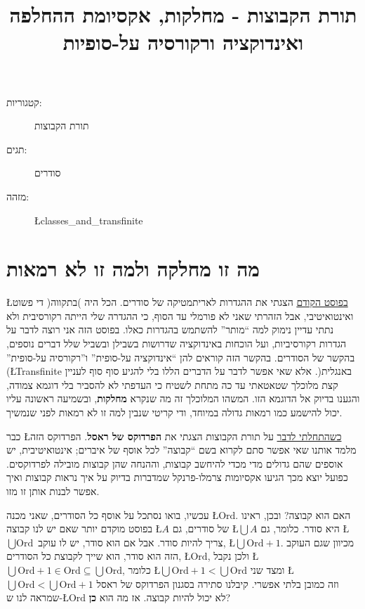 \documentclass[english,hebrew]{article}
\begin{document}
\title{תורת הקבוצות - מחלקות, אקסיומת ההחלפה ואינדוקציה ורקורסיה על-סופיות}
\maketitle
\begin{description}
\item [{קטגוריות:}] תורת הקבוצות
\item [{תגים:}] סודרים
\item [{מזהה:}] \L{classes\_and\_transfinite}
\end{description}

\section*{מה זו מחלקה ולמה זו לא רמאות}

\L{\href{https://gadial.net/2023/01/14/ordinal_arithmetic/}{בפוסט הקודם}}
הצגתי את ההגדרות לאריתמטיקה של סודרים. הכל היה )בתקווה( די פשוט ואינטואיטיבי,
אבל הזהרתי שאני לא פורמלי עד הסוף, כי ההגדרה שלי הייתה רקורסיבית ולא
נתתי עדיין נימוק למה \textquotedblleft מותר\textquotedblright{} להשתמש
בהגדרות כאלו. בפוסט הזה אני רוצה לדבר על הגדרות רקורסיביות, ועל הוכחות
באינדוקציה שדרושות בשבילן ובשביל שלל דברים נוספים, בהקשר של הסודרים.
בהקשר הזה קוראים להן \textquotedblleft אינדוקציה על-סופית\textquotedblright{}
ו\textquotedblright רקורסיה על-סופית\textquotedblright{} )\L{Transfinite}
באנגלית(. אלא שאי אפשר לדבר על הדברים הללו בלי להגיע סוף סוף לעניין
קצת מלוכלך שטאטאתי עד כה מתחת לשטיח כי העדפתי לא להסביר בלי דוגמא
צמודה, והגענו בדיוק אל הדוגמא הזו. המשהו המלוכלך זה מה שנקרא \textbf{מחלקות},
ובשמיעה ראשונה עליו יכול להישמע כמו רמאות גדולה במיוחד, ודי קריטי
שנבין למה זו לא רמאות לפני שנמשיך.

כבר \L{\href{https://gadial.net/2019/10/19/what_is_set_theory/}{כשהתחלתי לדבר}}
על תורת הקבוצות הצגתי את \textbf{הפרדוקס של ראסל}. הפרדוקס הזה מלמד
אותנו שאי אפשר סתם לקרוא בשם \textquotedblleft קבוצה\textquotedblright{}
לכל אוסף של איברים; אינטואיטיבית, יש אוספים שהם גדולים מדי מכדי להיחשב
קבוצות, וההנחה שהן קבוצות מובילה לפרדוקסים. כפועל יוצא מכך הגיעו אקסיומות
צרמלו-פרנקל שמדברות בדיוק על איך נראות קבוצות ואיך אפשר לבנות אותן
זו מזו.

עכשיו, בואו נסתכל על אוסף כל הסודרים, שאני מכנה \L{$\text{Ord}$}.
האם הוא קבוצה? ובכן, ראינו בפוסט מוקדם יותר שאם יש לנו קבוצה \L{$A$}
של סודרים, גם \L{$\bigcup A$} היא סודר. כלומר, גם \L{$\bigcup\text{Ord}$}
צריך להיות סודר. אבל אם הוא סודר, יש לו עוקב, \L{$\bigcup\text{Ord}+1$}.
מכיוון שגם העוקב הזה הוא סודר, הוא שייך לקבוצת כל הסודרים, \L{$\text{Ord}$},
ולכן נקבל \L{$\bigcup\text{Ord}+1\in\text{Ord}\subseteq\bigcup\text{Ord}$},
כלומר \L{$\bigcup\text{Ord}+1<\bigcup\text{Ord}$} ומצד שני \L{$\bigcup\text{Ord}<\bigcup\text{Ord}+1$}
וזה כמובן בלתי אפשרי. קיבלנו סתירה בסגנון הפרדוקס של ראסל שמראה לנו
ש-\L{$\text{Ord}$} לא יכול להיות קבוצה. אז מה הוא \textbf{כן}?
\end{document}

